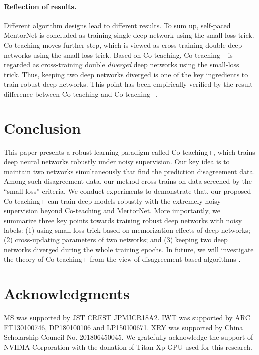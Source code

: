 \documentclass{article}
\begin{document}
\paragraph{Reflection of results.}
Different algorithm designs lead to different results. To sum up, self-paced MentorNet is concluded as training single deep network using the small-loss trick. Co-teaching moves further step, which is viewed as cross-training double deep networks using the small-loss trick. Based on Co-teaching, Co-teaching+ is regarded as cross-training double \textit{diverged} deep networks using the small-loss trick. Thus, keeping two deep networks diverged is one of the key ingredients to train robust deep networks. This point has been empirically verified by the result difference between Co-teaching and Co-teaching+.


\section{Conclusion}
\label{sect:conclusion}
This paper presents a robust learning paradigm called Co-teaching+, which trains deep neural networks robustly under noisy supervision. Our key idea is to maintain two networks simultaneously that find the prediction disagreement data. Among such disagreement data, our method cross-trains on data screened by the ``small loss'' criteria. We conduct experiments to demonstrate that, our proposed Co-teaching+ can train deep models robustly with the extremely noisy supervision beyond Co-teaching and MentorNet. More importantly, we summarize three key points towards training robust deep networks with noisy labels: (1) using small-loss trick based on memorization effects of deep networks; (2) cross-updating parameters of two networks; and (3) keeping two deep networks diverged during the whole training epochs.
In future, we will investigate the theory of Co-teaching+ from the view of disagreement-based algorithms
\cite{wang2017theoretical}.


\section*{Acknowledgments}
MS was supported by JST CREST JPMJCR18A2. IWT was supported by ARC FT130100746, DP180100106 and LP150100671. XRY was supported by China Scholarship Council No. 201806450045. We gratefully acknowledge the support of NVIDIA Corporation with the donation of Titan Xp GPU used for this research.


\end{document}
